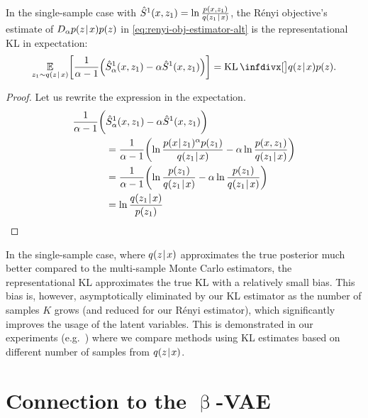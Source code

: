 \begin{proposition}
\label{prop:single-sample-renyi-estimate}
In the single-sample case with $\hat{S}^1(x, z_1)\allowbreak{}= \ln \frac{p(x,z_1)}{q(z_1\hspace{0.08em}|\hspace{0.11em} x)}$, the Rényi objective's estimate of $D_\alpha{p(z\hspace{0.08em}|\hspace{0.11em}x)}{p(z)}$ in \eqref{eq:renyi-obj-estimator-alt} is the representational KL in expectation:
{\def\groundprop{4}
\begin{align*}
\E_{z_1 \sim q(z\tmid x)} \biggl[ \frac{1}{\alpha-1}
                                 \Bigl( \hat{S}^1_\alpha(x,z_1) -
                                       \alpha \hat{S}^1(x,z_1) \Bigr)
                 \biggr]
= \KL\Div[\big]{q(z\tmid x)}{p(z)}.
\end{align*}}%
\end{proposition}
\begin{proof}
Let us rewrite the expression in the expectation.
\begin{align*}
\frac{1}{\alpha-1} \biggl( &\hat{S}^1_\alpha(x,z_1) - \alpha \hat{S}^1(x,z_1) \biggr)\\
&= \frac{1}{\alpha-1}\biggl(\ln \frac{p(x\hspace{0.08em}|\hspace{0.11em} z_1)^\alpha p(z_1)}{q(z_1\hspace{0.08em}|\hspace{0.11em} x)} - \alpha \ln \frac{p(x,z_1)}{q(z_1\hspace{0.08em}|\hspace{0.11em} x)}\biggr)\\
&= \frac{1}{\alpha-1}\biggl(\ln \frac{p(z_1)}{q(z_1\hspace{0.08em}|\hspace{0.11em} x)} - \alpha \ln \frac{p(z_1)}{q(z_1\hspace{0.08em}|\hspace{0.11em} x)}\biggr)\\
&= \ln \frac{q(z_1\hspace{0.08em}|\hspace{0.11em} x)}{p(z_1)}
\qedhere
\end{align*}
\end{proof}

In the single-sample case, where $q(z\hspace{0.08em}|\hspace{0.11em} x)$ approximates the true posterior much better compared to the multi-sample Monte Carlo estimators, the representational KL approximates the true KL with a relatively small bias.
This bias is, however, asymptotically eliminated by our KL estimator as the number of samples $K$ grows (and reduced for our Rényi estimator), which significantly improves the usage of the latent variables.
This is demonstrated in our experiments (e.g.\ ) where we compare methods using KL estimates based on different number of samples from $q(z\hspace{0.08em}|\hspace{0.11em} x)$.

\section[Connection to the $\upbeta$-VAE]{Connection to the \texorpdfstring{{\protect\scriptsizerrr$\upbeta$}}{Beta}-VAE}
\label{sec:connection-to-the-beta-vae}

